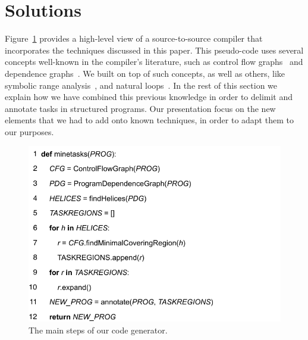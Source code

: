 \documentclass[sigplan,10pt,review,anonymous]{acmart}
\begin{document}

\section{Solutions}
\label{sec:sol}

Figure~\ref{fig:alg_main} provides a high-level view of a source-to-source
compiler that incorporates the techniques discussed in this paper.
This pseudo-code uses several concepts well-known in the compiler's
literature, such as control flow graphs~\cite{Kildall73} and
dependence graphs~\cite{Ferrante87}.
We built on top of such concepts, as well as others, like
symbolic range analysis~\cite{Blume94}, and natural loops~\cite{Allen70}.
In the rest of this section we explain how we have combined this previous
knowledge in order to delimit and annotate tasks in structured programs.
Our presentation focus on the new elements that we had to add onto known
techniques, in order to adapt them to our purposes.

\begin{figure}[b]
\begin{center}
\includegraphics[width=1\columnwidth]{images/alg_main}
\caption{The main steps of our code generator.}
\label{fig:alg_main}
\end{center}
\end{figure}
\end{document}
